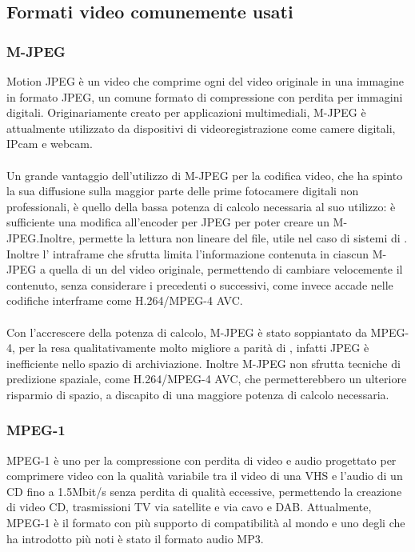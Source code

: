 	\subsection{Formati video comunemente usati}
		\subsubsection{M-JPEG}
			Motion \gls{JPEG}	è un  video che comprime ogni  del video originale in una immagine in formato \gls{JPEG}, un comune formato di compressione con perdita per immagini digitali. Originariamente creato per applicazioni multimediali, M-JPEG è attualmente utilizzato da dispositivi di videoregistrazione come camere digitali, IPcam e webcam.
			\paragraph*{}
			Un grande vantaggio dell'utilizzo di M-JPEG per la codifica video, che ha spinto la sua diffusione sulla maggior parte delle prime fotocamere digitali non professionali, è quello della bassa potenza di calcolo necessaria al suo utilizzo: è sufficiente una modifica  all'encoder  per \gls{JPEG} per poter creare un  M-JPEG.\@ Inoltre, permette la lettura non lineare del file, utile nel caso di sistemi di . Inoltre l' intraframe che sfrutta limita l'informazione contenuta in ciascun  M-JPEG a quella di un  del video originale, permettendo di cambiare velocemente il contenuto, senza considerare i  precedenti o successivi, come invece accade nelle codifiche interframe come H.264/MPEG-4 AVC.\@
			\paragraph*{}
			Con l'accrescere della potenza di calcolo, M-JPEG	è stato soppiantato da MPEG-4, per la resa qualitativamente molto migliore a parità di , infatti \gls{JPEG} è inefficiente nello spazio di archiviazione. Inoltre M-JPEG non sfrutta tecniche di predizione spaziale, come H.264/MPEG-4 AVC, che permetterebbero un ulteriore risparmio di spazio, a discapito di una maggiore potenza di calcolo necessaria.

		\subsubsection{MPEG-1}
			MPEG-1 è uno  per la compressione con perdita di video e audio progettato per comprimere video con la qualità variabile tra il video di una \gls{VHS} e l'audio di un \gls{CD} fino a 1.5Mbit/s senza perdita di qualità eccessive, permettendo la creazione di video \gls{CD}, trasmissioni TV via satellite e via cavo e \gls{DAB}. Attualmente, MPEG-1 è il formato  con più supporto di compatibilità al mondo e uno degli  che ha introdotto più noti è stato il formato audio MP3.
